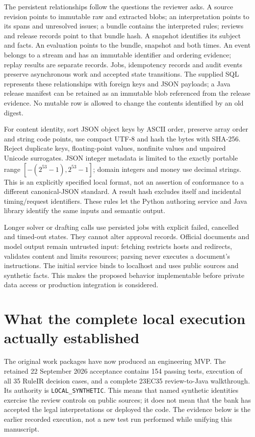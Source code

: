 \documentclass[12pt,a4paper,oneside,openany]{book}
\begin{document}
The persistent relationships follow the questions the reviewer asks. A source
revision points to immutable raw and extracted blobs; an interpretation points
to its spans and unresolved issues; a bundle contains the interpreted rules;
reviews and release records point to that bundle hash. A snapshot identifies
its subject and facts. An evaluation points to the bundle, snapshot and both
times. An event belongs to a stream and has an immutable identifier and ordering
evidence; replay results are separate records. Jobs, idempotency records and audit
events preserve asynchronous work and accepted state transitions. The supplied
SQL represents these relationships with foreign keys and JSON payloads; a Java
release manifest can be retained as an immutable blob referenced from the
release evidence. No mutable row is allowed to change the contents identified
by an old digest.

For content identity, sort JSON object keys by ASCII order, preserve array order
and string code points, use compact UTF-8 and hash the bytes with SHA-256.
Reject duplicate keys, floating-point values, nonfinite values and unpaired
Unicode surrogates. JSON integer metadata is limited to the exactly portable
range $[-(2^{53}-1),2^{53}-1]$; domain integers and money use decimal strings.
This is an explicitly specified local format, not an assertion of conformance
to a different canonical-JSON standard. A result hash excludes itself and
incidental timing/request identifiers. These rules let the Python authoring
service and Java library identify the same inputs and semantic output.

Longer solver or drafting calls use persisted jobs with explicit failed,
cancelled and timed-out states. They cannot alter approval records. Official
documents and model output remain untrusted input: fetching restricts hosts and
redirects, validates content and limits resources; parsing never executes a
document's instructions. The initial service binds to localhost and uses public
sources and synthetic facts. This makes the proposed behavior implementable
before private data access or production integration is considered.

\section{What the complete local execution actually established}
\label{sec:executed-workbench}

The original work packages have now produced an engineering MVP. The retained
22 September 2026 acceptance contains 154 passing tests, execution of all
35 RuleIR decision cases, and a complete 23EC35 review-to-Java walkthrough.
Its authority is \texttt{LOCAL\_SYNTHETIC}. This means that named synthetic
identities exercise the review controls on public sources; it does not mean
that the bank has accepted the legal interpretations or deployed the code.
The evidence below is the earlier recorded execution, not a new test run
performed while unifying this manuscript.
\end{document}
